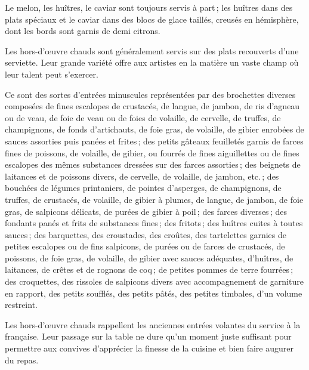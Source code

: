 Le melon, les huîtres, le caviar sont toujours servis à part ; les huîtres dans
des plats spéciaux et le caviar dans des blocs de glace taillés, creusés en
hémisphère, dont les bords sont garnis de demi citrons.

Les hors-d'œuvre chauds sont généralement servis sur des plats recouverts d'une
serviette. Leur grande variété offre aux artistes en la matière un vaste champ où
leur talent peut s'exercer.

Ce sont des sortes d'entrées minuscules représentées par des brochettes
diverses composées de fines escalopes de crustacés, de langue, de jambon, de
ris d'agneau ou de veau, de foie de veau ou de foies de volaille, de cervelle,
de truffes, de champignons, de fonds d'artichauts, de foie gras, de volaille,
de gibier enrobées de sauces assorties puis panées et frites ; des petits
gâteaux feuilletés garnis de farces fines de poissons, de volaille, de gibier,
ou fourrés de fines aiguillettes ou de fines escalopes des mêmes substances
dressées sur des farces assorties ; des beignets de laitances et de poissons
divers, de cervelle, de volaille, de jambon, etc. ; des bouchées de légumes
printaniers, de pointes d’asperges, de champignons, de truffes, de crustacés,
de volaille, de gibier à plumes, de langue, de jambon, de foie gras, de
salpicons délicats, de purées de gibier à poil ; des farces diverses ; des
fondants panés et frits de substances fines ; des fritots ; des huîtres cuites
à toutes sauces ; des barquettes, des croustades, des croûtes, des tartelettes
garnies de petites escalopes ou de fins salpicons, de purées ou de farces de
crustacés, de poissons, de foie gras, de volaille, de gibier avec sauces
adéquates, d'huîtres, de laitances, de crêtes et de rognons de coq ; de petites
pommes de terre fourrées ; des croquettes, des rissoles de salpicons divers avec
accompagnement de garniture en rapport, des petits soufflés, des petits pâtés,
des petites timbales, d'un volume restreint.

Les hors-d'œuvre chauds rappellent les anciennes entrées volantes du service
à la française. Leur passage sur la table ne dure qu'un moment juste suffisant
pour permettre aux convives d'apprécier la finesse de la cuisine et bien faire
augurer du repas.
